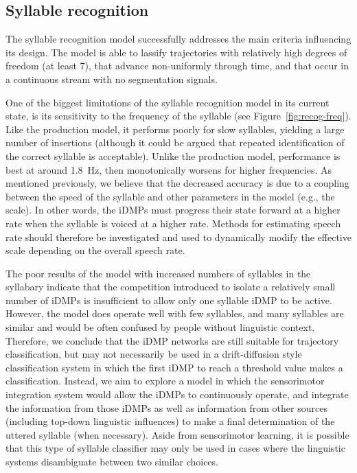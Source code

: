 \subsection{Syllable recognition}

The syllable recognition model
successfully addresses the main criteria
influencing its design.
The model is able to lassify trajectories
with relatively high degrees of freedom
(at least 7),
that advance non-uniformly through time,
and that occur in a continuous stream
with no segmentation signals.

One of the biggest limitations
of the syllable recognition model
in its current state,
is its sensitivity to the
frequency of the syllable
(see Figure~\ref{fig:recog-freq}).
Like the production model,
it performs poorly for
slow syllables,
yielding a large number of insertions
(although it could be argued that
repeated identification of the correct
syllable is acceptable).
Unlike the production model,
performance is best at around 1.8~Hz,
then monotonically worsens
for higher frequencies.
As mentioned previously,
we believe that the decreased accuracy
is due to a coupling between
the speed of the syllable
and other parameters in the model
(e.g., the scale).
In other words, the iDMPs
must progress their state forward
at a higher rate when
the syllable is voiced at a higher rate.
Methods for estimating speech rate
should therefore be investigated
and used to dynamically modify
the effective scale
depending on the overall speech rate.

The poor results of the model
with increased numbers
of syllables in the syllabary
indicate that the competition
introduced to isolate a relatively small
number of iDMPs is insufficient
to allow only one syllable iDMP to be active.
However, the model does operate well
with few syllables,
and many syllables are similar
and would be often confused by people
without linguistic context.
Therefore, we conclude that
the iDMP networks are still suitable
for trajectory classification,
but may not necessarily be used in a
drift-diffusion style classification system
in which the first iDMP to reach
a threshold value makes a classification.
Instead, we aim to explore a model in which
the sensorimotor integration system
would allow the iDMPs to continuously operate,
and integrate the information from those iDMPs
as well as information from other sources
(including top-down linguistic influences)
to make a final determination
of the uttered syllable
(when necessary).
Aside from sensorimotor learning,
it is possible that
this type of syllable classifier
may only be used in cases where
the linguistic systems
disambiguate between two similar choices.


